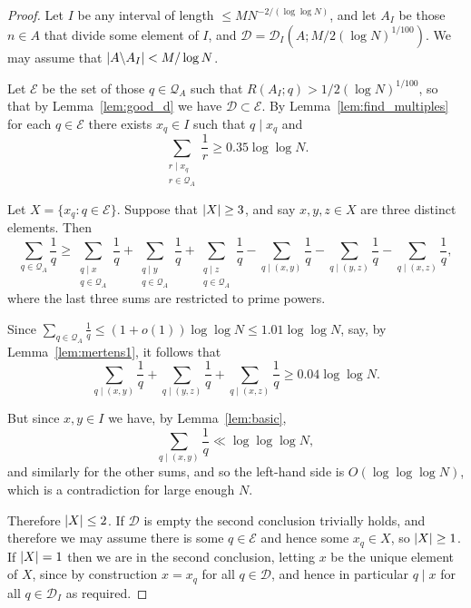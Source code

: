 \begin{proof}
  \leanok
Let $I$ be any interval of length $\leq MN^{-2/(\log\log N)}$, and let $A_I$ be those $n\in A$ that divide some element of $I$, and $\mathcal{D}=\mathcal{D}_I(A;M/2(\log N)^{1/100})$. We may assume that $\left\lvert A\backslash A_I\right\rvert< M/\log N$.

Let $\mathcal{E}$ be the set of those $q\in\mathcal{Q}_A$ such that $R(A_I;q)> 1/2(\log N)^{1/100}$, so that by Lemma~\ref{lem:good_d} we have $\mathcal{D}\subset \mathcal{E}$. By Lemma~\ref{lem:find_multiples} for each $q\in\mathcal{E}$ there exists $x_q\in I$ such that $q\mid x_q$ and
\[\sum_{\substack{r\mid x_q\\ r\in \mathcal{Q}_A}}\frac{1}{r}\geq 0.35\log\log N.\]


Let $X=\{x_q : q\in \mathcal{E}\}$. Suppose that $\left\lvert X\right\rvert\geq 3$, and say $x,y,z\in X$ are three distinct elements. Then
\[\sum_{q\in\mathcal{Q}_A}\frac{1}{q}\geq \sum_{\substack{q\mid x\\ q\in \mathcal{Q}_A}}\frac{1}{q}+\sum_{\substack{q\mid y\\ q\in \mathcal{Q}_A}}\frac{1}{q}+\sum_{\substack{q\mid z\\ q\in \mathcal{Q}_A}}\frac{1}{q}-\sum_{q\mid (x,y)}\frac{1}{q}-\sum_{q\mid (y,z)}\frac{1}{q}-\sum_{q\mid (x,z)}\frac{1}{q},\]
where the last three sums are restricted to prime powers.

Since $\sum_{q\in\mathcal{Q}_A}\frac{1}{q}\leq (1+o(1))\log\log N\leq 1.01\log\log N$, say, by Lemma~\ref{lem:mertens1}, it follows that
\[\sum_{q\mid (x,y)}\frac{1}{q}+\sum_{q\mid (y,z)}\frac{1}{q}+\sum_{q\mid (x,z)}\frac{1}{q}\geq 0.04\log\log N.\]

But since $x,y\in I$ we have, by Lemma~\ref{lem:basic},
  \[\sum_{q\mid (x,y)}\frac{1}{q}\ll \log\log\log N,\]
and similarly for the other sums, and so the left-hand side is $O(\log\log\log N)$, which is a contradiction for large enough $N$.

Therefore $\left\lvert X\right\rvert\leq 2$. If $\mathcal{D}$ is empty the second conclusion trivially holds, and therefore we may assume there is some $q\in \mathcal{E}$ and hence some $x_q\in X$, so $\left\lvert X\right\rvert\geq 1$. If $\left\lvert X\right\rvert=1$ then we are in the second conclusion, letting $x$ be the unique element of $X$, since by construction $x=x_q$ for all $q\in \mathcal{D}$, and hence in particular $q\mid x$ for all $q\in \mathcal{D}_I$ as required.


\end{proof}
